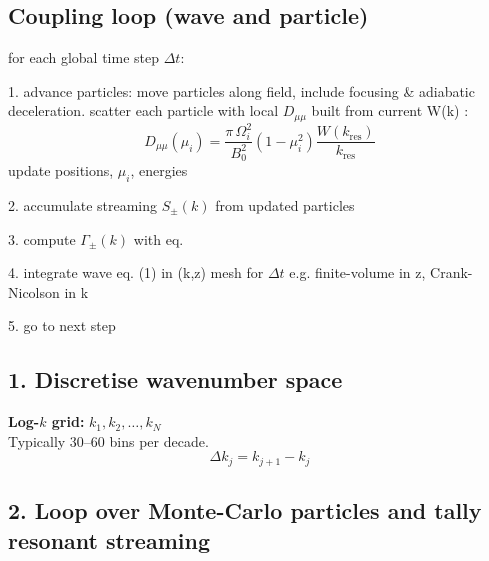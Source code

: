 \subsection{Coupling loop (wave and particle)}
for each global time step $\Delta t$:

     1. advance particles: 
    move particles along field, include focusing \& adiabatic deceleration.
    scatter each particle with local $D_{\mu\mu}$ built from current W(k) :
        \[
D_{\mu\mu}(\mu_i) = \frac{\pi \, \Omega_i^2}{B_0^2} (1 - \mu_i^2) \frac{W(k_{\text{res}})}{k_{\text{res}}}
\]
    update positions, $\mu_i$, energies

     2. accumulate streaming $S_{\pm}(k)$ from updated particles  

     3. compute $\Gamma_{\pm}(k)$ with eq. 

     4. integrate wave eq. (1) in (k,z) mesh for $\Delta t$
         e.g. finite-volume in z, Crank-Nicolson in k

     5. go to next step





\subsection{1.  Discretise wavenumber space}

\begin{tcolorbox}[colframe=black, colback=white]
\textbf{Log-$k$ grid:} \quad \( k_1, k_2, \ldots, k_N \) \\
Typically 30--60 bins per decade. \\
\[
\Delta k_j = k_{j+1} - k_j
\]
\end{tcolorbox}



\subsection{2.  Loop over Monte-Carlo particles and tally resonant streaming}

